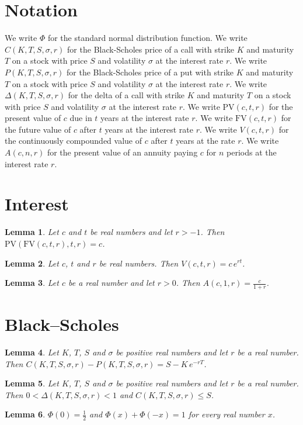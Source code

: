 \documentclass{article}
\newtheorem{lemma}{Lemma}
\begin{document}
\section{Notation}

We write $\Phi$ for the standard normal distribution function.
We write $C(K,T,S,\sigma,r)$ for the Black-Scholes price of a call with strike $K$ and maturity $T$ on a stock with price $S$ and volatility $\sigma$ at the interest rate $r$.
We write $P(K,T,S,\sigma,r)$ for the Black-Scholes price of a put with strike $K$ and maturity $T$ on a stock with price $S$ and volatility $\sigma$ at the interest rate $r$.
We write $\Delta(K,T,S,\sigma,r)$ for the delta of a call with strike $K$ and maturity $T$ on a stock with price $S$ and volatility $\sigma$ at the interest rate $r$.
We write $\mathrm{PV}(c,t,r)$ for the present value of $c$ due in $t$ years at the interest rate $r$.
We write $\mathrm{FV}(c,t,r)$ for the future value of $c$ after $t$ years at the interest rate $r$.
We write $V(c,t,r)$ for the continuously compounded value of $c$ after $t$ years at the rate $r$.
We write $A(c,n,r)$ for the present value of an annuity paying $c$ for $n$ periods at the interest rate $r$.

\section{Interest}

\begin{lemma}\label{discount}
Let $c$ and $t$ be real numbers and let $r>-1$. Then $\mathrm{PV}(\mathrm{FV}(c,t,r),t,r)=c$.
\end{lemma}

\begin{lemma}\label{continuous}
Let $c$, $t$ and $r$ be real numbers. Then $V(c,t,r)=c\,e^{rt}$.
\end{lemma}

\begin{lemma}\label{annuity}
Let $c$ be a real number and let $r>0$. Then $A(c,1,r)=\frac{c}{1+r}$.
\end{lemma}

\section{Black--Scholes}

\begin{lemma}\label{parity}
Let $K$, $T$, $S$ and $\sigma$ be positive real numbers and let $r$ be a real number. Then $C(K,T,S,\sigma,r)-P(K,T,S,\sigma,r)=S-K\,e^{-rT}$.
\end{lemma}

\begin{lemma}\label{delta}
Let $K$, $T$, $S$ and $\sigma$ be positive real numbers and let $r$ be a real number. Then $0<\Delta(K,T,S,\sigma,r)<1$ and $C(K,T,S,\sigma,r)\le S$.
\end{lemma}

\begin{lemma}\label{phi}
$\Phi(0)=\frac12$ and $\Phi(x)+\Phi(-x)=1$ for every real number $x$.
\end{lemma}
\end{document}
